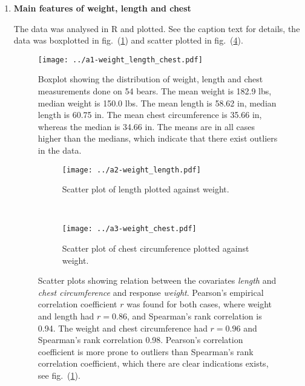 \documentclass[a4paper,11pt]{article}
\begin{document}
\begin{enumerate}[label=\alph*)]
    \item \textbf{Main features of weight, length and chest} 

        The data was analysed in R and plotted. See the caption text for details, the data was boxplotted in fig.~(\ref{fig:a1}) and scatter plotted in fig.~(\ref{fig:a2}).

        \begin{figure}[htb]
            \centering
            \texttt{[image: ../a1-weight\_length\_chest.pdf]}
            \caption{Boxplot showing the distribution of weight, length and chest measurements done on 54 bears. The mean weight is 182.9 lbs, median weight is 150.0 lbs. The mean length is 58.62 in, median length is 60.75 in. The mean chest circumference is 35.66 in, whereas the median is 34.66 in. The means are in all cases higher than the medians, which indicate that there exist outliers in the data.}
            \label{fig:a1}
        \end{figure}

        \begin{figure}[htb]
            \centering
            \begin{subfigure}[b]{0.45\textwidth}
                \texttt{[image: ../a2-weight\_length.pdf]}
                \label{fig:a2a}
                \caption{Scatter plot of length plotted against weight.}
            \end{subfigure}
            ~
            \begin{subfigure}[b]{0.45\textwidth}
                \texttt{[image: ../a3-weight\_chest.pdf]}
                \label{fig:a2b}
                \caption{Scatter plot of chest circumference plotted against weight.}
            \end{subfigure}
            \caption{Scatter plots showing relation between the covariates \textit{length} and \textit{chest circumference} and response \textit{weight}. Pearson's empirical correlation coefficient $r$ was found for both cases, where weight and length had $r = 0.86$, and Spearman's rank correlation is 0.94. The weight and chest circumference had $r = 0.96$ and Spearman's rank correlation 0.98. Pearson's correlation coefficient is more prone to outliers than Spearman's rank correlation coefficient, which there are clear indications exists, see fig.~(\ref{fig:a1}).  }
            \label{fig:a2}
        \end{figure}


\end{enumerate}
\end{document}
